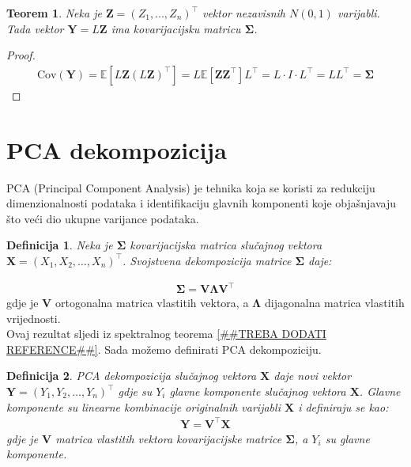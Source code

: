 \documentclass[zavrsnirad]{fer}
\newtheorem{definition}{Definicija}
\newtheorem{theorem}{Teorem}
\newtheorem{proof}{Dokaz}
\begin{document}
\begin{theorem}
Neka je $\mathbf{Z} = (Z_1, ..., Z_n)^\intercal$ vektor nezavisnih $N(0,1)$ varijabli. Tada vektor $\mathbf{Y} = L\mathbf{Z}$ ima kovarijacijsku matricu $\boldsymbol{\Sigma}$.
\end{theorem}
\begin{proof}
\begin{align*}
\text{Cov}(\mathbf{Y}) = \mathbb{E}[L\mathbf{Z}(L\mathbf{Z})^\intercal]
    = L\mathbb{E}[\mathbf{Z}\mathbf{Z}^\intercal]L^\intercal
    = L \cdot I \cdot L^\intercal = LL^\intercal = \boldsymbol{\Sigma}
\end{align*}
\end{proof}

\section{PCA dekompozicija}
\label{sek:pca}
PCA (Principal Component Analysis) je tehnika koja se koristi za
redukciju dimenzionalnosti podataka i identifikaciju glavnih komponenti koje
objašnjavaju što veći dio ukupne varijance podataka.
\begin{definition}
    Neka je $\boldsymbol{\Sigma}$ kovarijacijska matrica slučajnog
    vektora $\mathbf{X} = (X_1, X_2, \dots, X_n)^\intercal$.
    Svojstvena dekompozicija matrice
    $\boldsymbol{\Sigma}$ daje:
\end{definition}
\begin{align*}
    \boldsymbol{\Sigma} = \boldsymbol{V} \boldsymbol{\Lambda} \boldsymbol{V}^\intercal
\end{align*}
\indent gdje je $\boldsymbol{V}$ ortogonalna matrica vlastitih vektora, a
$\boldsymbol{\Lambda}$
dijagonalna matrica vlastitih vrijednosti.\\

\noindent Ovaj rezultat sljedi iz spektralnog teorema \ref{##TREBA DODATI REFERENCE##}.
Sada možemo definirati PCA dekompoziciju.
\begin{definition}
    PCA dekompozicija slučajnog vektora $\mathbf{X}$ daje novi vektor
    $\mathbf{Y} = (Y_1, Y_2, \dots, Y_n)^\intercal$ gdje su $Y_i$
    glavne komponente slučajnog vektora $\mathbf{X}$.
\indent Glavne komponente su linearne kombinacije originalnih varijabli
    $\mathbf{X}$ i definiraju se kao:
    \begin{align*}
        \mathbf{Y} = \boldsymbol{V}^\intercal \mathbf{X}
    \end{align*}
    \indent gdje je $\boldsymbol{V}$ matrica vlastitih vektora kovarijacijske
    matrice $\boldsymbol{\Sigma}$, a $Y_i$ su glavne komponente.
\end{definition}
\end{document}
